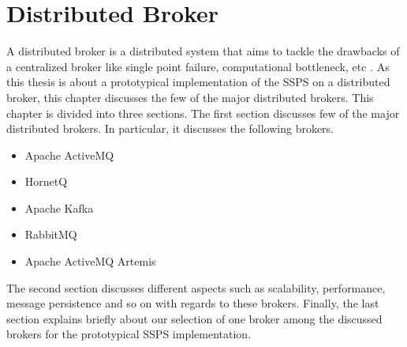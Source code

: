 \chapter{Distributed Broker}\label{chapter:distributed_broker}

A distributed broker is a distributed system that aims to tackle the drawbacks of a centralized broker like single point failure, computational bottleneck, etc \parencite{distributed_broker}. As this thesis is about a prototypical implementation of the SSPS on a distributed broker, this chapter discusses the few of the major distributed brokers. This chapter is divided into three sections. The first section discusses few of the major distributed brokers. In particular, it discusses the following brokers.

\begin{itemize}
  \item Apache ActiveMQ
  \item HornetQ
  \item Apache Kafka
  \item RabbitMQ
  \item Apache ActiveMQ Artemis
\end{itemize}

The second section discusses different aspects such as scalability, performance, message persistence and so on with regards to these brokers. Finally, the last section explains briefly about our selection of one broker among the discussed brokers for the prototypical SSPS implementation.